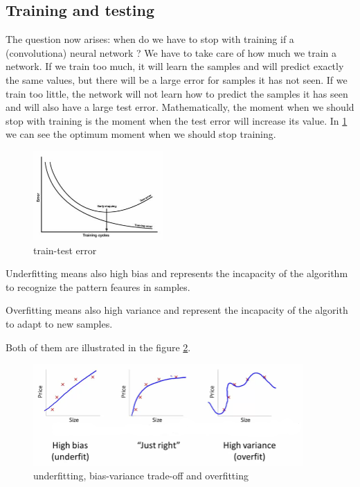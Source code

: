 \newpage

\subsection{Training and testing}
\label{train-test}

The question now arises: when do we have to stop with training if a (convolutiona) neural network ?
We have to take care of how much we train a network. If we train too much, it will learn the samples and will predict exactly the same values, but there will be a large error for samples it has not seen. If we train too little, the network will not learn how to predict the samples it has seen and will also have a large test error.
Mathematically, the moment when we should stop with training is the moment when the test error will increase its value. In \ref{fig:traintest} we can see the optimum moment when we should stop training.

\begin{figure}[h]
	\begin{center}
		\includegraphics[width=188px,height=129px]{src/img/state/traintest}
		\caption{train-test error\cite{traintest}} \label{fig:traintest}
    \end{center}
\end{figure}

Underfitting means also high bias and represents the incapacity of the algorithm to recognize the pattern feaures in samples.

Overfitting means also high variance and represent the incapacity of the algorith to adapt to new samples.

Both of them are illustrated in the figure \ref{fig:overfitting}.

\begin{figure}[h]
	\begin{center}
		\includegraphics[width=390px,height=147px]{src/img/state/overfitting}
		\caption{underfitting, bias-variance trade-off and overfitting\cite{ng}} \label{fig:overfitting}
    \end{center}
\end{figure}

